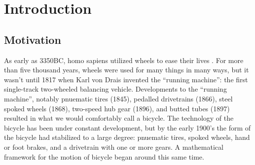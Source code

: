 \chapter{Introduction}
\section{Motivation}

As early as 3350BC, homo sapiens utilized wheels to ease
their lives . For more than five thousand years, wheels were
used for many things in many ways, but it wasn't until 1817 when Karl von Drais
invented the ``running machine'': the first single-track two-wheeled balancing
vehicle. Developments to the ``running machine'', notably pnuematic tires (1845),
pedalled drivetrains (1866), steel spoked wheels (1868), two-speed hub gear
(1896), and butted tubes (1897) resulted in what we would comfortably call a
bicycle. The technology of the bicycle has been under constant development, but
by the early 1900's the form of the bicycle had stabilized to a large degree:
pnuematic tires, spoked wheels, hand or foot brakes, and a drivetrain with one
or more gears. A mathematical framework for the motion of bicycle began
around this same time\cite{Whipple1899}.
